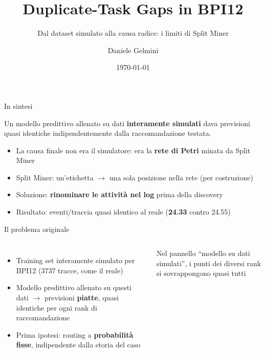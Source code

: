 \documentclass[11pt,aspectratio=169]{beamer}
\title{Duplicate-Task Gaps in BPI12}
\subtitle{Dal dataset simulato alla causa radice: i limiti di Split Miner}
\author{Daniele Gelmini}
\date{\today}
\newcommand{\good}[1]{\textcolor{goodcol}{\textbf{#1}}}
\begin{document}
\begin{frame}
\titlepage
\end{frame}

\begin{frame}{In sintesi}
\begin{block}{}
Un modello predittivo allenato su dati \textbf{interamente simulati} dava previsioni quasi identiche indipendentemente dalla raccomandazione testata.
\end{block}
\vspace{0.5em}
\begin{itemize}
\item La causa finale non era il simulatore: era la \textbf{rete di Petri} minata da Split Miner
\item Split Miner: un'etichetta $\to$ una sola posizione nella rete (per costruzione)
\item Soluzione: \textbf{rinominare le attivit\`a nel log} prima della discovery
\item Risultato: eventi/traccia quasi identico al reale (\good{24.33} contro 24.55)
\end{itemize}
\end{frame}

\begin{frame}{Il problema originale}
\begin{columns}[T]
\begin{itemize}
\item Training set interamente simulato per BPI12 (3737 tracce, come il reale)
\item Modello predittivo allenato su questi dati $\to$ previsioni \textbf{piatte}, quasi identiche per ogni rank di raccomandazione
\item Prima ipotesi: routing a \textbf{probabilit\`a fisse}, indipendente dalla storia del caso
\end{itemize}
\begin{tcolorbox}[colback=warnsoft,colframe=warncol,title=Sintomo]
Nel pannello ``modello su dati simulati'', i punti dei diversi rank si sovrappongono quasi tutti
\end{tcolorbox}
\end{columns}
\end{frame}
\end{document}
